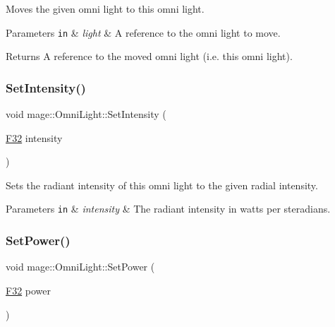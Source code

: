 Moves the given omni light to this omni light.


\begin{DoxyParams}[1]{Parameters}
\mbox{\tt in}  & {\em light} & A reference to the omni light to move. \\
\hline
\end{DoxyParams}
\begin{DoxyReturn}{Returns}
A reference to the moved omni light (i.\+e. this omni light). 
\end{DoxyReturn}
\hypertarget{classmage_1_1_omni_light_add3fece8f288f4d4b55357143faa490b}{}\label{classmage_1_1_omni_light_add3fece8f288f4d4b55357143faa490b} 
\subsubsection{\texorpdfstring{Set\+Intensity()}{SetIntensity()}}
{\footnotesize\ttfamily void mage\+::\+Omni\+Light\+::\+Set\+Intensity (\begin{DoxyParamCaption}\item[{\hyperlink{namespacemage_aa97e833b45f06d60a0a9c4fc22ae02c0}{F32}}]{intensity }\end{DoxyParamCaption})\hspace{0.3cm}{\ttfamily [noexcept]}}

Sets the radiant intensity of this omni light to the given radial intensity.


\begin{DoxyParams}[1]{Parameters}
\mbox{\tt in}  & {\em intensity} & The radiant intensity in watts per steradians. \\
\hline
\end{DoxyParams}
\hypertarget{classmage_1_1_omni_light_a03f277ecf566147aa54c95816871de10}{}\label{classmage_1_1_omni_light_a03f277ecf566147aa54c95816871de10} 
\subsubsection{\texorpdfstring{Set\+Power()}{SetPower()}}
{\footnotesize\ttfamily void mage\+::\+Omni\+Light\+::\+Set\+Power (\begin{DoxyParamCaption}\item[{\hyperlink{namespacemage_aa97e833b45f06d60a0a9c4fc22ae02c0}{F32}}]{power }\end{DoxyParamCaption})\hspace{0.3cm}{\ttfamily [noexcept]}}

